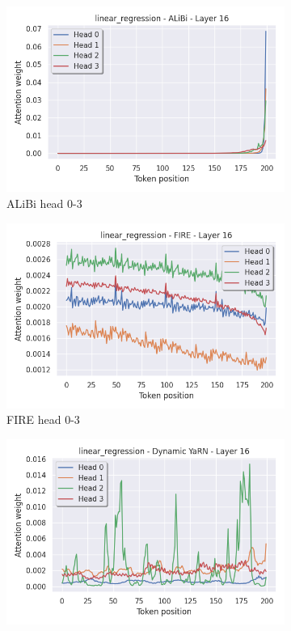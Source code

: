 \documentclass[letterpaper]{article} %
\begin{document}
\begin{figure}[tp]
    \centering
    \begin{subfigure}[t]{0.32\linewidth}
        \includegraphics[width=\linewidth]{AnonymousSubmission/LaTeX/imgs/analysis/alibi_head0.png}
        \caption{ALiBi head 0-3}
    \end{subfigure}
    \begin{subfigure}[t]{0.32\linewidth}
        \includegraphics[width=\linewidth]{AnonymousSubmission/LaTeX/imgs/analysis/fire_head0.png}
        \caption{FIRE head 0-3}
    \end{subfigure}
    \begin{subfigure}[t]{0.32\linewidth}
        \includegraphics[width=\linewidth]{AnonymousSubmission/LaTeX/imgs/analysis/dyarn_head0.png}

\end{subfigure}
\end{figure}
\end{document}
